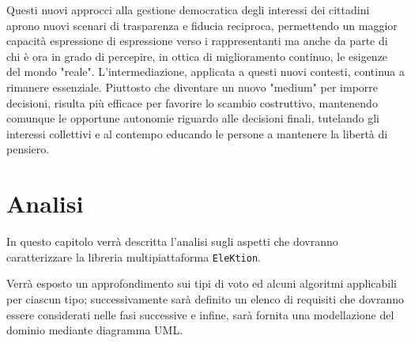 \documentclass[12pt,a4paper,openright,twoside]{book}
\begin{document}
Questi nuovi approcci alla gestione democratica degli interessi dei cittadini aprono nuovi
scenari di trasparenza e fiducia reciproca, permettendo un maggior capacità espressione di espressione
verso i rappresentanti ma anche da parte di chi è ora in grado di percepire, in ottica di miglioramento continuo,
le esigenze del mondo "reale". 
L'intermediazione, applicata a questi nuovi contesti, continua a rimanere essenziale.
Piuttosto che diventare un nuovo "medium" per imporre decisioni, risulta più efficace per
favorire lo scambio costruttivo, mantenendo comunque le opportune autonomie riguardo alle
decisioni finali, tutelando gli interessi collettivi e al contempo educando le persone a mantenere
la libertà di pensiero\cite{castelfranchi2019problematic}.


\chapter{Analisi}
In questo capitolo verrà descritta l'analisi sugli aspetti che dovranno 
caratterizzare la libreria multipiattaforma \texttt{EleKtion}.

Verrà esposto un approfondimento sui tipi di voto
ed alcuni algoritmi applicabili per ciascun tipo; successivamente sarà definito un 
elenco di requisiti che dovranno essere considerati nelle fasi successive e infine,
sarà fornita una modellazione del dominio mediante diagramma UML.
\end{document}
